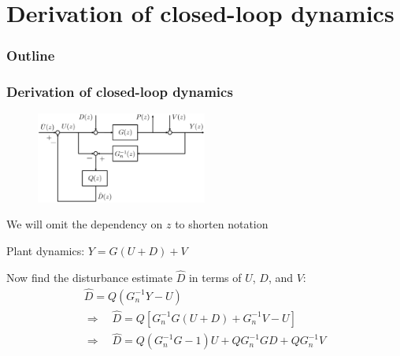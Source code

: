 \section{Derivation of closed-loop dynamics}
\begin{frame}
    \frametitle{Outline}
    \tableofcontents[currentsection]
\end{frame}

\begin{frame}
    \frametitle{Derivation of closed-loop dynamics}

    \begin{figure}
        \includegraphics[width=0.5\textwidth]{Disturbance_Observer_DO}\\
    \end{figure}

    We will omit the dependency on $z$ to shorten notation
    \pause

    Plant dynamics: $Y = G(U+D) + V$
    \pause

    Now find the disturbance estimate $\hat{D}$ in terms of $U$, $D$, and $V$:
    \pause
    \begin{gather*}
        \hat{D} = Q (G_n^{-1} Y - U) \\
        \Rightarrow \quad \hat{D} = Q [ G_n^{-1} G (U+D) + G_n^{-1} V - U ] \\
        \Rightarrow \quad \hat{D} = Q ( G_n^{-1} G - 1) U + Q G_n^{-1} GD + QG_n^{-1} V
    \end{gather*}
\end{frame}

